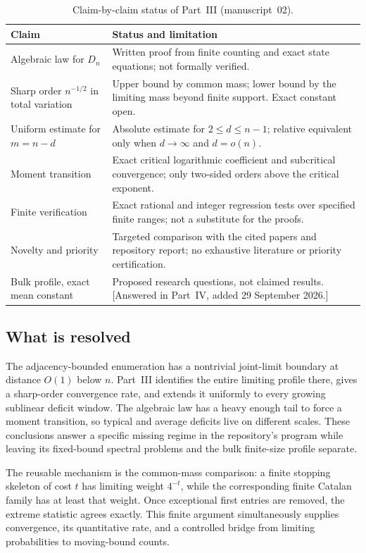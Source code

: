 \documentclass[11pt,a4paper]{article}
\theoremstyle{definition}\newaliascnt{definition}{theorem}
\theoremstyle{remark}\newaliascnt{remark}{theorem}
\begin{document}
\begin{table}[tbp]
\centering
\caption{Claim-by-claim status of Part~III (manuscript~02).}
\label{lj:tab:audit}
\small
\begin{tabular}{p{.42\linewidth}p{.51\linewidth}}
\toprule
Claim & Status and limitation\\
\midrule
Algebraic law for $D_n$ & Written proof from finite counting and exact
state equations; not formally verified.\\
Sharp order $n^{-1/2}$ in total variation & Upper bound by common mass;
lower bound by the limiting mass beyond finite support. Exact constant open.\\
Uniform estimate for $m=n-d$ & Absolute estimate for $2\le d\le n-1$;
relative equivalent only when $d\to\infty$ and $d=o(n)$.\\
Moment transition & Exact critical logarithmic coefficient and subcritical
convergence; only two-sided orders above the critical exponent.\\
Finite verification & Exact rational and integer regression tests over
specified finite ranges; not a substitute for the proofs.\\
Novelty and priority & Targeted comparison with the cited papers and
repository report; no exhaustive literature or priority certification.\\
Bulk profile, exact mean constant & Proposed research questions, not
claimed results. [Answered in Part~IV, added 29 September 2026.]\\
\bottomrule
\end{tabular}
\end{table}

\subsection{What is resolved}
The adjacency-bounded enumeration has a nontrivial joint-limit boundary
at distance $O(1)$ below $n$. Part~III identifies the entire limiting
profile there, gives a sharp-order convergence rate, and extends it
uniformly to every growing sublinear deficit window. The algebraic law
has a heavy enough tail to force a moment transition, so typical and
average deficits live on different scales. These conclusions answer a
specific missing regime in the repository's program while leaving its
fixed-bound spectral problems and the bulk finite-size profile separate.

The reusable mechanism is the common-mass comparison: a finite stopping
skeleton of cost $t$ has limiting weight $4^{-t}$, while the corresponding
finite Catalan family has at least that weight. Once exceptional first
entries are removed, the extreme statistic agrees exactly. This finite
argument simultaneously supplies convergence, its quantitative rate, and
a controlled bridge from limiting probabilities to moving-bound counts.
\end{document}
